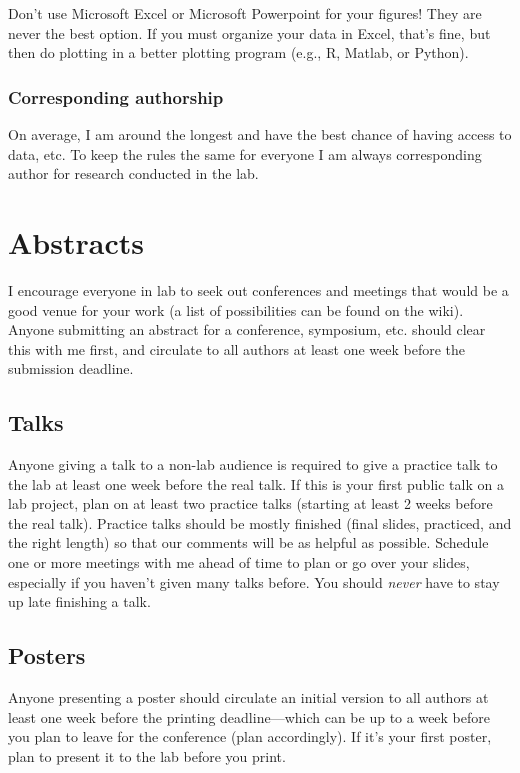 \documentclass[letterpaper,12pt,oneside]{memoir}
\begin{document}
\begin{shaded}
\noindent Don't use Microsoft Excel or Microsoft Powerpoint for your figures! They are never the best option. If you must organize your data in Excel, that's fine, but then do plotting in a better plotting program (e.g., R, Matlab, or Python).
\end{shaded}


\subsubsection{Corresponding authorship}
On average, I am around the longest and have the best chance of having access to data, etc. To keep the rules the same for everyone I am always corresponding author for research conducted in the lab.



\section{Abstracts}
I encourage everyone in lab to seek out conferences and meetings that would be a good venue for your work (a list of possibilities can be found on the wiki). Anyone submitting an abstract for a conference, symposium, etc. should clear this with me first, and circulate to all authors at least one week before the submission deadline.

\subsection{Talks}
Anyone giving a talk to a non-lab audience is required to give a practice talk to the lab at least one week before the real talk. If this is your first public talk on a lab project, plan on at least two practice talks (starting at least 2 weeks before the real talk). Practice talks should be mostly finished (final slides, practiced, and the right length) so that our comments will be as helpful as possible. Schedule one or more meetings with me ahead of time to plan or go over your slides, especially if you haven't given many talks before. You should \textit{never} have to stay up late finishing a talk.

\subsection{Posters}
Anyone presenting a poster should circulate an initial version to all authors at least one week before the printing deadline---which can be up to a week before you plan to leave for the conference (plan accordingly). If it's your first poster, plan to present it to the lab before you print. 
\end{document}
